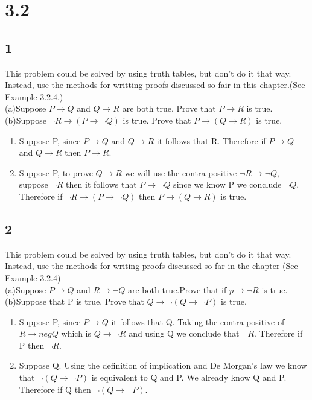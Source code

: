 \documentclass{article}
\begin{document}
\section{3.2}
\subsection{1}
This problem could be solved by using truth tables, but don't do it that way. Instead, use the methods for writting proofs discussed so fair in this chapter.(See Example 3.2.4.)
\\
(a)Suppose $P \rightarrow Q$ and $Q \rightarrow R$ are both true. Prove that $P \rightarrow R$ is true.
(b)Suppose $\neg R \rightarrow (P \rightarrow \neg Q )$ is true. Prove that $P \rightarrow (Q \rightarrow R)$ is true.
\begin{enumerate}[label=(\alph*)]
    \item 
    Suppose P, since $P \rightarrow Q$ and $Q \rightarrow R$ it follows that R. Therefore if $P \rightarrow Q$ and $Q \rightarrow R$ then $P \rightarrow R$.
    \item
    Suppose P, to prove $Q \rightarrow R$ we will use the contra positive $\neg R \rightarrow \neg Q$, suppose $\neg R$ then it follows that  $P \rightarrow \neg Q$ since we know P we conclude $\neg Q$. Therefore if $\neg R \rightarrow (P \rightarrow \neg Q )$ then $P \rightarrow (Q \rightarrow R)$ is true.
\end{enumerate}
\subsection{2}
This problem could be solved by using truth tables, but don't do it that way. Instead, use the methods for writing proofs discussed so far in the chapter (See Example 3.2.4)
\\
(a)Suppose $P \rightarrow Q$ and $R \rightarrow \neg Q$ are both true.Prove that if $p \rightarrow \neg R$ is true.
(b)Suppose that P is true. Prove that  $Q \rightarrow \neg (Q \rightarrow \neg P)$ is true.

\begin{enumerate}[label=(\alph*)]
    \item 
    Suppose P, since $P \rightarrow Q$ it follows that Q. Taking the contra positive of $R \rightarrow neg Q$ which is $Q \rightarrow \neg R$ and using Q we conclude that $\neg R$. Therefore if P then $\neg R$.
    \item
    Suppose Q. Using the definition of implication and De Morgan's law we know that $\neg (Q \rightarrow \neg P)$ is equivalent to Q and P. We already know Q and P. Therefore if Q then $\neg(Q \rightarrow \neg P)$.
\end{enumerate}
\end{document}
